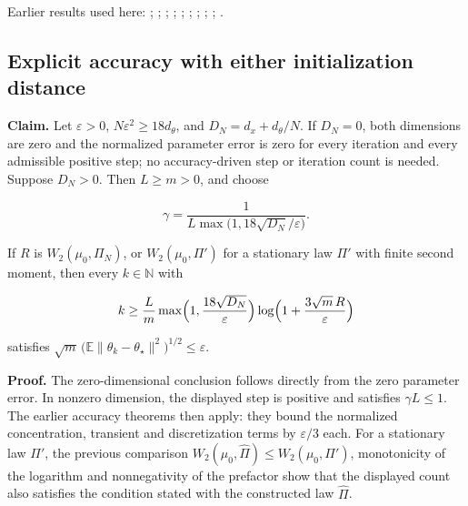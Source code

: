 \documentclass[11pt,a4paper]{report}
\begin{document}
Earlier results used here: \cite[Section~3.17.4]{LangevinLean2026ULASC}; \cite[Section~3.36.7]{LangevinLean2026ULASC}; \cite[Section~3.51.3]{LangevinLean2026ULASC}; \cite[Section~3.1.1]{LangevinLean2026IPLA}; \cite[Section~3.1.6]{LangevinLean2026IPLA}; \cite[Section~3.18.1]{LangevinLean2026IPLA}; \cite[Section~3.3.1]{LangevinLean2026IPLA}; \cite[Section~3.3.2]{LangevinLean2026IPLA}; \cite[Section~3.3.3]{LangevinLean2026IPLA}; \cite[Section~3.5.1]{LangevinLean2026IPLA}.
\subsection{\texorpdfstring{Explicit accuracy with either initialization distance}{Explicit accuracy with either initialization distance}}
\label{report-step-WassersteinMixing-IPLATheorem-lean-5}


\textbf{Claim.} Let \(\varepsilon>0\), \(N\varepsilon^2\ge18d_\theta\), and \(D_N=d_x+d_\theta/N\). If \(D_N=0\), both dimensions are zero and the normalized parameter error is zero for every iteration and every admissible positive step; no accuracy-driven step or iteration count is needed. Suppose \(D_N>0\). Then \(L\ge m>0\), and choose

\[\gamma=\frac1{L\max\bigl(1,18\sqrt{D_N}/\varepsilon\bigr)}.\]

If \(R\) is \(W_2(\mu_0,\Pi_N)\), or \(W_2(\mu_0,\Pi')\) for a stationary law \(\Pi'\) with finite second moment, then every \(k\in\mathbb N\) with

\[k\ge\frac Lm\max\Bigl(1,\frac{18\sqrt{D_N}}\varepsilon\Bigr)\log\Bigl(1+\frac{3\sqrt m\,R}\varepsilon\Bigr)\]

satisfies \(\sqrt m\,\bigl(\mathbb E\|\theta_k-\theta_\star\|^2\bigr)^{1/2}\le\varepsilon\).



\textbf{Proof.} The zero-dimensional conclusion follows directly from the zero parameter error. In nonzero dimension, the displayed step is positive and satisfies \(\gamma L\le1\). The earlier accuracy theorems then apply: they bound the normalized concentration, transient and discretization terms by \(\varepsilon/3\) each. For a stationary law \(\Pi'\), the previous comparison \(W_2(\mu_0,\widehat\Pi)\le W_2(\mu_0,\Pi')\), monotonicity of the logarithm and nonnegativity of the prefactor show that the displayed count also satisfies the condition stated with the constructed law \(\widehat\Pi\).
\end{document}
